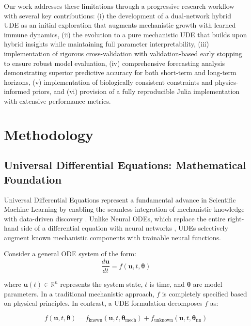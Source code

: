 \documentclass{juliacon}
\begin{document}
Our work addresses these limitations through a progressive research workflow with several key contributions: (i) the development of a dual-network hybrid UDE as an initial exploration that augments mechanistic growth with learned immune dynamics, (ii) the evolution to a pure mechanistic UDE that builds upon hybrid insights while maintaining full parameter interpretability, (iii) implementation of rigorous cross-validation with validation-based early stopping to ensure robust model evaluation, (iv) comprehensive forecasting analysis demonstrating superior predictive accuracy for both short-term and long-term horizons, (v) implementation of biologically consistent constraints and physics-informed priors, and (vi) provision of a fully reproducible Julia implementation with extensive performance metrics.

\section{Methodology}

\subsection{Universal Differential Equations: Mathematical Foundation}

Universal Differential Equations represent a fundamental advance in Scientific Machine Learning by enabling the seamless integration of mechanistic knowledge with data-driven discovery \cite{lu2021deeponet}. Unlike Neural ODEs, which replace the entire right-hand side of a differential equation with neural networks \cite{chen2018node,dupont2019augmented}, UDEs selectively augment known mechanistic components with trainable neural functions.

Consider a general ODE system of the form:
\begin{equation}
\frac{d\mathbf{u}}{dt} = f(\mathbf{u}, t, \boldsymbol{\theta})
\label{eq:general_ode}
\end{equation}

where $\mathbf{u}(t) \in \mathbb{R}^n$ represents the system state, $t$ is time, and $\boldsymbol{\theta}$ are model parameters. In a traditional mechanistic approach, $f$ is completely specified based on physical principles. In contrast, a UDE formulation decomposes $f$ as:

\begin{equation}
f(\mathbf{u}, t, \boldsymbol{\theta}) = f_{\text{known}}(\mathbf{u}, t, \boldsymbol{\theta}_{\text{mech}}) + f_{\text{unknown}}(\mathbf{u}, t, \boldsymbol{\theta}_{\text{nn}})
\label{eq:ude_decomposition}
\end{equation}
\end{document}
